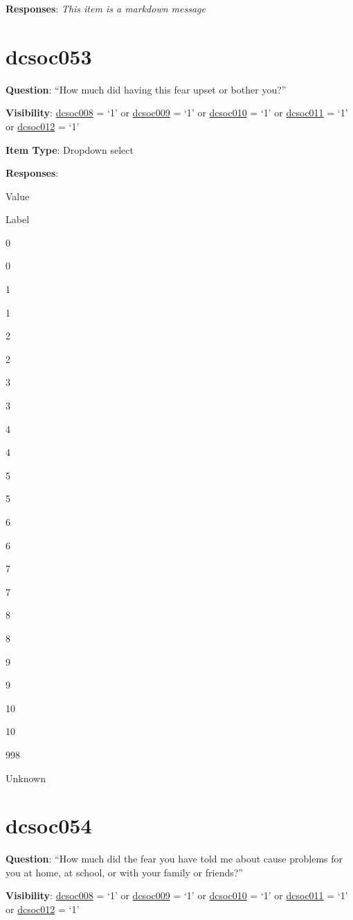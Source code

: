 \documentclass[]{book}
\begin{document}
\textbf{Responses}: \emph{This item is a markdown message}

\hypertarget{dcsoc053}{%
\section{dcsoc053}\label{dcsoc053}}

\textbf{Question}: ``How much did having this fear upset or bother you?''

\textbf{Visibility}: \protect\hyperlink{dcsoc008}{dcsoc008} = `1' or \protect\hyperlink{dcsoc009}{dcsoc009} = `1' or \protect\hyperlink{dcsoc010}{dcsoc010} = `1' or \protect\hyperlink{dcsoc011}{dcsoc011} = `1' or \protect\hyperlink{dcsoc012}{dcsoc012} = `1'

\textbf{Item Type}: Dropdown select

\textbf{Responses}:

Value

Label

0

0

1

1

2

2

3

3

4

4

5

5

6

6

7

7

8

8

9

9

10

10

998

Unknown

\hypertarget{dcsoc054}{%
\section{dcsoc054}\label{dcsoc054}}

\textbf{Question}: ``How much did the fear you have told me about cause problems for you at home, at school, or with your family or friends?''

\textbf{Visibility}: \protect\hyperlink{dcsoc008}{dcsoc008} = `1' or \protect\hyperlink{dcsoc009}{dcsoc009} = `1' or \protect\hyperlink{dcsoc010}{dcsoc010} = `1' or \protect\hyperlink{dcsoc011}{dcsoc011} = `1' or \protect\hyperlink{dcsoc012}{dcsoc012} = `1'
\end{document}
